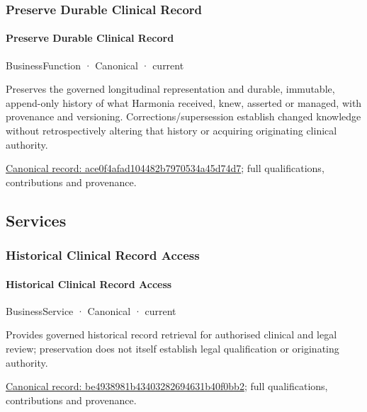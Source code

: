 \subsubsection{Preserve Durable Clinical Record}

\paragraph{Preserve Durable Clinical Record}

\label{element:ace0f4afad104482b7970534a45d74d7}
{\small BusinessFunction · Canonical · current}\par

Preserves the governed longitudinal representation and durable, immutable, append-only history of what Harmonia received, knew, asserted or managed, with provenance and versioning. Corrections/supersession establish changed knowledge without retrospectively altering that history or acquiring originating clinical authority.


{\footnotesize \href{../../../../continuum/business/business-function/ace0f4afad104482b7970534a45d74d7.md}{Canonical record: ace0f4afad104482b7970534a45d74d7}; full qualifications, contributions and provenance.}\par
\subsection{Services}

\subsubsection{Historical Clinical Record Access}

\paragraph{Historical Clinical Record Access}

\label{element:be4938981b43403282694631b40f0bb2}
{\small BusinessService · Canonical · current}\par

Provides governed historical record retrieval for authorised clinical and legal review; preservation does not itself establish legal qualification or originating authority.


{\footnotesize \href{../../../../continuum/business/business-service/be4938981b43403282694631b40f0bb2.md}{Canonical record: be4938981b43403282694631b40f0bb2}; full qualifications, contributions and provenance.}\par
